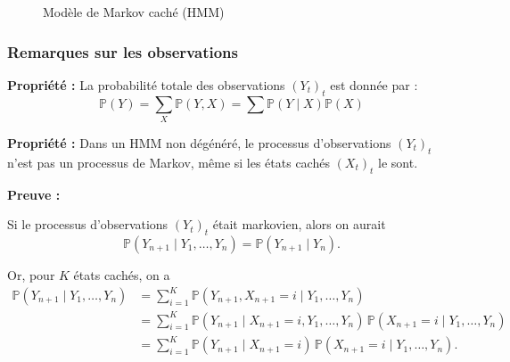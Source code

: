\documentclass[11pt]{article}
\begin{document}
\begin{figure}[h]
\centering
{}
\caption{Modèle de Markov caché (HMM)}
\end{figure}


\newpage



\subsubsection{Remarques sur les observations}

\textbf{Propriété :}
La probabilité totale des observations $(Y_t)_{t}$ est donnée par : 
\[
\mathbb{P}(Y) = \sum_{X}\mathbb{P}(Y,X) = \sum_{}\mathbb{P}(Y \mid X)\mathbb{P}(X)
\]
\vspace{0.3cm}

\textbf{Propriété :}
Dans un HMM non dégénéré, le processus d'observations $(Y_t)_{t}$ n'est pas un processus de Markov, même si les états cachés $(X_t)_{t}$ le sont. 

\textbf{Preuve :}

Si le processus d'observations $(Y_t)_{t}$ était markovien, alors on aurait
\[
\mathbb{P}(Y_{n+1} \mid Y_1,\dots,Y_n) = \mathbb{P}(Y_{n+1} \mid Y_n).
\]

Or, pour $K$ états cachés, on a
\begin{align*}
\mathbb{P}(Y_{n+1} \mid Y_1,\dots,Y_n)
&= \sum_{i=1}^{K} \mathbb{P}(Y_{n+1}, X_{n+1}=i \mid Y_1,\dots,Y_n) \\
&= \sum_{i=1}^{K} \mathbb{P}(Y_{n+1} \mid X_{n+1}=i, Y_1,\dots,Y_n)\,
\mathbb{P}(X_{n+1}=i \mid Y_1,\dots,Y_n) \\
&= \sum_{i=1}^{K} \mathbb{P}(Y_{n+1} \mid X_{n+1}=i)\,
\mathbb{P}(X_{n+1}=i \mid Y_1,\dots,Y_n).
\end{align*}
\end{document}
